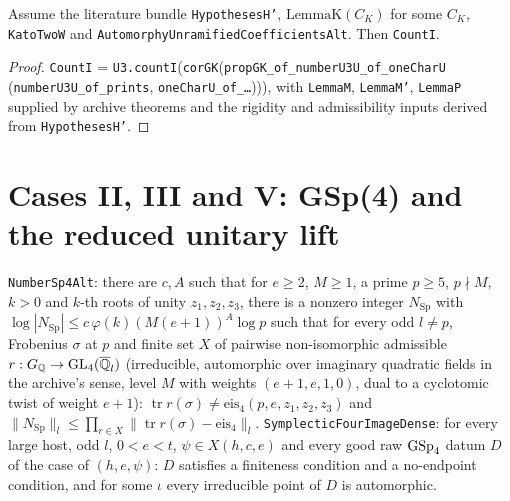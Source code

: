 \begin{theorem}\label{sha:counti-main}
Assume the literature bundle \texttt{HypothesesH'}, $\mathrm{LemmaK}(C_K)$ for some $C_K$,
\texttt{KatoTwoW} and \texttt{AutomorphyUnramifiedCoefficientsAlt}. Then \texttt{CountI}.
\end{theorem}
\begin{proof}
\texttt{CountI} = \texttt{U3.countI}(\texttt{corGK}(\texttt{propGK\_of\_numberU3U\_of\_oneCharU}
(\texttt{numberU3U\_of\_prints}, \texttt{oneCharU\_of\_{\ldots}}))), with \texttt{LemmaM},
\texttt{LemmaM'}, \texttt{LemmaP} supplied by archive theorems and the rigidity and
admissibility inputs derived from \texttt{HypothesesH'}.
\end{proof}

\section{Cases II, III and V: GSp(4) and the reduced unitary lift}

\begin{definition}\label{sha:gsp4-inputs}
\texttt{NumberSp4Alt}: there are $c,A$ such that for $e\ge2$, $M\ge1$, a prime $p\ge5$,
$p\nmid M$, $k>0$ and $k$-th roots of unity $z_1,z_2,z_3$, there is a nonzero integer
$N_{\mathrm{Sp}}$ with $\log|N_{\mathrm{Sp}}|\le c\,\varphi(k)(M(e+1))^A\log p$ such that for
every odd $l\ne p$, Frobenius $\sigma$ at $p$ and finite set $X$ of pairwise non-isomorphic
admissible $r:G_{\mathbb{Q}}\to\mathrm{GL}_4(\overline{\mathbb{Q}}_l)$ (irreducible, automorphic over imaginary quadratic
fields in the archive's sense, level $M$ with weights $(e+1,e,1,0)$, dual to a cyclotomic twist
of weight $e+1$): $\operatorname{tr}r(\sigma)\ne\mathrm{eis}_4(p,e,z_1,z_2,z_3)$ and
$\|N_{\mathrm{Sp}}\|_l\le\prod_{r\in X}\|\operatorname{tr}r(\sigma)-\mathrm{eis}_4\|_l$.
\texttt{SymplecticFourImageDense}: for every large host, odd $l$, $0<e<t$, $\psi\in X(h,c,e)$
and every good raw $\mathrm{GSp}_4$ datum $D$ of the case of $(h,e,\psi)$: $D$ satisfies a finiteness
condition and a no-endpoint condition, and for some $\iota$ every irreducible point of $D$ is
automorphic.
\end{definition}


